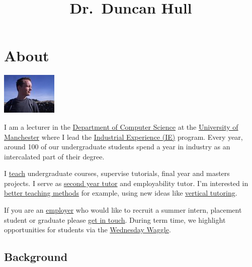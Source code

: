 \documentclass[12pt,]{book}
\title{Dr.~Duncan Hull}
\author{}
\date{}
\begin{document}
\maketitle

{
\setcounter{tocdepth}{1}
\tableofcontents
}
\hypertarget{about}{%
\chapter*{About}\label{about}}

\begin{center}\includegraphics[width=0.25\linewidth]{images/me-blue} \end{center}

I am a lecturer in the \href{https://www.cs.manchester.ac.uk/}{Department of Computer Science} at the \href{https://www.manchester.ac.uk}{University of Manchester} where I lead the \href{https://www.cs.manchester.ac.uk/study/undergraduate/industrial-experience/}{Industrial Experience (IE)} program. Every year, around 100 of our undergraduate students spend a year in industry as an intercalated part of their degree.

I \protect\hyperlink{teaching}{teach} undergraduate courses, supervise tutorials, final year and masters projects. I serve as \href{http://studentnet.cs.manchester.ac.uk/ugt/year2/}{second year tutor} and employability tutor. I'm interested in \protect\hyperlink{research}{better teaching methods} for example, using new ideas like \protect\hyperlink{vertical}{vertical tutoring}.

If you are an \protect\hyperlink{employers}{employer} who would like to recruit a summer intern, placement student or graduate please \protect\hyperlink{contact}{get in touch}. During term time, we highlight opportunities for students via the \href{https://waggle.cs.manchester.ac.uk/waggle/about}{Wednesday Waggle}.

\hypertarget{background}{%
\section*{Background}\label{background}}
\end{document}

